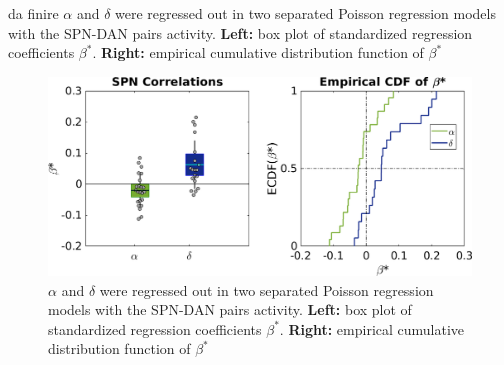 {\color{red}da finire}
$\alpha$ and $\delta$ were regressed out in two separated Poisson regression models with the SPN-DAN pairs activity. \textbf{Left:} box plot of standardized regression coefficients $\beta^*$. \textbf{Right:} empirical cumulative distribution function of $\beta^*$
\begin{figure}
   \centering
    \includegraphics[scale=0.5]{figures/AlphaAndDeltaPavSPN1.png}
    \caption{$\alpha$ and $\delta$ were regressed out in two separated Poisson regression models with the SPN-DAN pairs activity. \textbf{Left:} box plot of standardized regression coefficients $\beta^*$. \textbf{Right:} empirical cumulative distribution function of $\beta^*$}
    \label{fig:RL_alphadelta}
\end{figure}